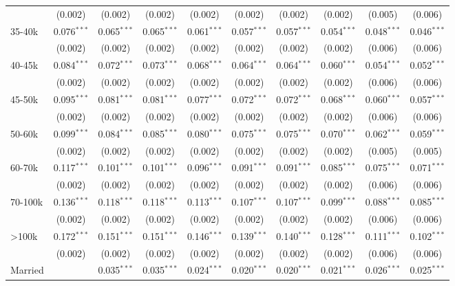 \begin{table}[!htbp]
{\begin{tabular}{@{\extracolsep{5pt}}lccccccccc}
  & (0.002) & (0.002) & (0.002) & (0.002) & (0.002) & (0.002) & (0.002) & (0.005) & (0.006) \\
  35-40k & 0.076$^{***}$ & 0.065$^{***}$ & 0.065$^{***}$ & 0.061$^{***}$ & 0.057$^{***}$ & 0.057$^{***}$ & 0.054$^{***}$ & 0.048$^{***}$ & 0.046$^{***}$ \\
  & (0.002) & (0.002) & (0.002) & (0.002) & (0.002) & (0.002) & (0.002) & (0.006) & (0.006) \\
  40-45k & 0.084$^{***}$ & 0.072$^{***}$ & 0.073$^{***}$ & 0.068$^{***}$ & 0.064$^{***}$ & 0.064$^{***}$ & 0.060$^{***}$ & 0.054$^{***}$ & 0.052$^{***}$ \\
  & (0.002) & (0.002) & (0.002) & (0.002) & (0.002) & (0.002) & (0.002) & (0.006) & (0.006) \\
  45-50k & 0.095$^{***}$ & 0.081$^{***}$ & 0.081$^{***}$ & 0.077$^{***}$ & 0.072$^{***}$ & 0.072$^{***}$ & 0.068$^{***}$ & 0.060$^{***}$ & 0.057$^{***}$ \\
  & (0.002) & (0.002) & (0.002) & (0.002) & (0.002) & (0.002) & (0.002) & (0.006) & (0.006) \\
  50-60k & 0.099$^{***}$ & 0.084$^{***}$ & 0.085$^{***}$ & 0.080$^{***}$ & 0.075$^{***}$ & 0.075$^{***}$ & 0.070$^{***}$ & 0.062$^{***}$ & 0.059$^{***}$ \\
  & (0.002) & (0.002) & (0.002) & (0.002) & (0.002) & (0.002) & (0.002) & (0.005) & (0.005) \\
  60-70k & 0.117$^{***}$ & 0.101$^{***}$ & 0.101$^{***}$ & 0.096$^{***}$ & 0.091$^{***}$ & 0.091$^{***}$ & 0.085$^{***}$ & 0.075$^{***}$ & 0.071$^{***}$ \\
  & (0.002) & (0.002) & (0.002) & (0.002) & (0.002) & (0.002) & (0.002) & (0.006) & (0.006) \\
  70-100k & 0.136$^{***}$ & 0.118$^{***}$ & 0.118$^{***}$ & 0.113$^{***}$ & 0.107$^{***}$ & 0.107$^{***}$ & 0.099$^{***}$ & 0.088$^{***}$ & 0.085$^{***}$ \\
  & (0.002) & (0.002) & (0.002) & (0.002) & (0.002) & (0.002) & (0.002) & (0.006) & (0.006) \\
  >100k & 0.172$^{***}$ & 0.151$^{***}$ & 0.151$^{***}$ & 0.146$^{***}$ & 0.139$^{***}$ & 0.140$^{***}$ & 0.128$^{***}$ & 0.111$^{***}$ & 0.102$^{***}$ \\
  & (0.002) & (0.002) & (0.002) & (0.002) & (0.002) & (0.002) & (0.002) & (0.006) & (0.006) \\
  Married &  & 0.035$^{***}$ & 0.035$^{***}$ & 0.024$^{***}$ & 0.020$^{***}$ & 0.020$^{***}$ & 0.021$^{***}$ & 0.026$^{***}$ & 0.025$^{***}$ \\

\end{tabular}}
\end{table}
